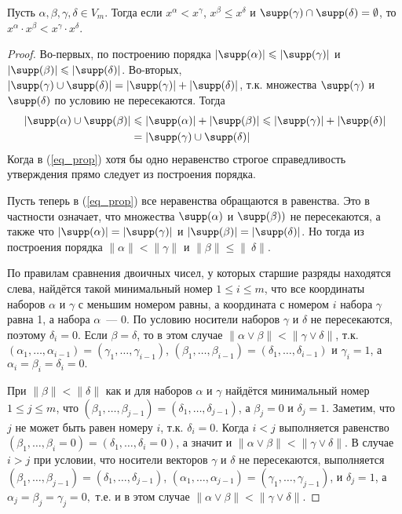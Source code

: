 \begin{proposition}
	\label{prop_order}
	Пусть $\alpha, \beta, \gamma, \delta \in V_m$.
	Тогда если $x^{\alpha} < x^{\gamma}$, $x^{\beta} \leqslant x^{\delta}$ и $\supp(\gamma) \cap \supp(\delta)=\emptyset$, то $x^{\alpha} \cdot x^{\beta} < x^{\gamma}\cdot x^{\delta}$.
\end{proposition}
\begin{proof}
	Во-первых, по построению порядка \(|\supp(\alpha)|\leqslant|\supp(\gamma)|\) и \(|\supp(\beta)|\leqslant |\supp(\delta)|\).
	Во-вторых, \(|\supp(\gamma)\cup \supp(\delta)|=|\supp(\gamma)|+|\supp(\delta)|\), т.к. множества \(\supp(\gamma)\) и \(\supp(\delta)\) по условию не пересекаются.
	Тогда
	\begin{equation}
		\begin{split}
			\label{eq_prop}
			|\supp(\alpha)\cup\supp(\beta)| &\leqslant |\supp(\alpha)| + |\supp(\beta)| \leqslant |\supp(\gamma)| + |\supp(\delta)|\\
			&= |\supp(\gamma)\cup\supp(\delta)|
		\end{split}
	\end{equation}
	Когда в (\ref{eq_prop}) хотя бы одно неравенство строгое справедливость утверждения прямо следует из построения порядка.

	Пусть теперь в (\ref{eq_prop}) все неравенства обращаются в равенства.
	Это в частности означает, что множества \(\supp(\alpha)\) и \(\supp(\beta))\) не пересекаются, а также что \(|\supp(\alpha)|=|\supp(\gamma)|\) и \(|\supp(\beta)|=|\supp(\delta)|\).
	Но тогда из построения порядка \(\|\alpha\| < \|\gamma\|\) и \(\|\beta\|\leqslant\|\ \delta\|\).

	По правилам сравнения двоичных чисел, у которых старшие разряды находятся слева, найдётся такой минимальный номер \(1\leqslant i\leqslant m\), что все координаты наборов \(\alpha\) и \(\gamma\) с меньшим номером равны, а координата с номером \(i\) набора \(\gamma\) равна 1, а набора \(\alpha\)~--- 0.
	По условию носители наборов \(\gamma\) и \(\delta\) не пересекаются, поэтому \(\delta_i = 0\).
	Если \(\beta=\delta\), то в этом случае \(\|\alpha\vee\beta\|<\|\gamma\vee\delta\|\), т.к.
	\((\alpha_1,\ldots,\alpha_{i-1})=(\gamma_1,\ldots,\gamma_{i-1})\), \((\beta_1,\ldots,\beta_{i-1})=(\delta_1,\ldots,\delta_{i-1})\) и \(\gamma_{i}=1\), а \(\alpha_{i}=\beta_{i}=\delta_{i}=0.\)

	При \(\|\beta\|<\|\delta\|\) как и для наборов \(\alpha\) и \(\gamma\) найдётся минимальный номер \(1\leqslant j\leqslant m\), что \((\beta_1,\ldots,\beta_{j-1})=(\delta_1,\ldots,\delta_{j-1})\), а \(\beta_j=0\) и \(\delta_j=1\).
	Заметим, что \(j\) не может быть равен номеру \(i\), т.к.
	\(\delta_i=0\).
	Когда \(i < j\) выполняется равенство  \((\beta_1,\ldots,\beta_{i}=0)=(\delta_1,\ldots,\delta_{i}=0)\), а значит и \(\|\alpha\vee\beta\|<\|\gamma\vee\delta\|\).
	В случае \(i > j\) при условии, что носители векторов \(\gamma\) и \(\delta\) не пересекаются, выполняется \((\beta_1,\ldots,\beta_{j-1})=(\delta_1,\ldots,\delta_{j-1})\), \((\alpha_1,\ldots,\alpha_{j-1})=(\gamma_1,\ldots,\gamma_{j-1})\),  и \(\delta_{j}=1\), а \(\alpha_{j}=\beta_{j}=\gamma_{j}=0,\) т.е.
	и в этом случае \(\|\alpha\vee\beta\|<\|\gamma\vee\delta\|\).


\end{proof}
